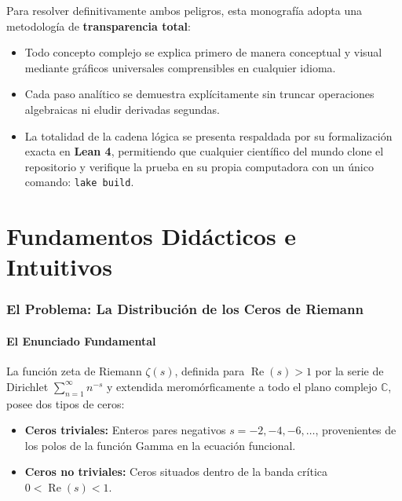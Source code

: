 \documentclass[11pt,a4paper]{article}
\theoremstyle{definition}
\theoremstyle{remark}
\begin{document}
Para resolver definitivamente ambos peligros, esta monografía adopta una metodología de \textbf{transparencia total}:
\begin{itemize}
    \item Todo concepto complejo se explica primero de manera conceptual y visual mediante gráficos universales comprensibles en cualquier idioma.
    \item Cada paso analítico se demuestra explícitamente sin truncar operaciones algebraicas ni eludir derivadas segundas.
    \item La totalidad de la cadena lógica se presenta respaldada por su formalización exacta en \textbf{Lean 4}, permitiendo que cualquier científico del mundo clone el repositorio y verifique la prueba en su propia computadora con un único comando: \texttt{lake build}.
\end{itemize}

\newpage

\part{Fundamentos Didácticos e Intuitivos}

\section{El Problema: La Distribución de los Ceros de Riemann}

\subsection{El Enunciado Fundamental}
La función zeta de Riemann $\zeta(s)$, definida para $\operatorname{Re}(s) > 1$ por la serie de Dirichlet $\sum_{n=1}^\infty n^{-s}$ y extendida meromórficamente a todo el plano complejo $\mathbb{C}$, posee dos tipos de ceros:
\begin{itemize}
    \item \textbf{Ceros triviales:} Enteros pares negativos $s = -2, -4, -6, \dots$, provenientes de los polos de la función Gamma en la ecuación funcional.
    \item \textbf{Ceros no triviales:} Ceros situados dentro de la banda crítica $0 < \operatorname{Re}(s) < 1$.
\end{itemize}
\end{document}

